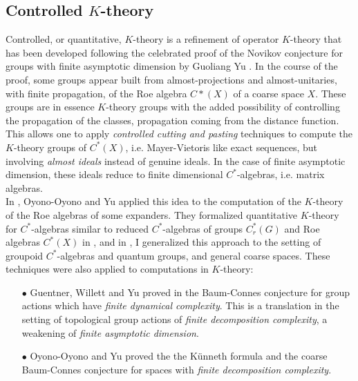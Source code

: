 \subsection{Controlled $K$-theory}

Controlled, or quantitative, $K$-theory is a refinement of operator $K$-theory that has been developed following the celebrated proof of the Novikov conjecture for groups with finite asymptotic dimension by Guoliang Yu \cite{Yu1}. In the course of the proof, some groups appear built from almost-projections and almost-unitaries, with finite propagation, of the Roe algebra $C*(X)$ of a coarse space $X$. These groups are in essence $K$-theory groups with the added possibility of controlling the propagation of the classes, propagation coming from the distance function. This allows one to apply \textit{controlled cutting and pasting} techniques to compute the $K$-theory groups of $C^*(X)$, i.e. Mayer-Vietoris like exact sequences, but involving \textit{almost ideals} instead of genuine ideals. In the case of finite asymptotic dimension, these ideals reduce to finite dimensional $C^*$-algebras, i.e. matrix algebras.\\

In \cite{OY1}, Oyono-Oyono and Yu applied this idea to the computation of the $K$-theory of the Roe algebras of some expanders. They formalized quantitative $K$-theory for $C^*$-algebras similar to reduced $C^*$-algebras of groups $C^*_r(G)$ and Roe algebras $C^*(X)$ in \cite{OY2}, and in \cite{dell2018controlled}, I generalized this approach to the setting of groupoid $C^*$-algebras and quantum groups, and general coarse spaces. These techniques were also applied to computations in $K$-theory:\\
\begin{itemize} 
\item[$\bullet$] Guentner, Willett and Yu proved in \cite{GWY2} the Baum-Connes conjecture for group actions which have \textit{finite dynamical complexity}. This is a translation in the setting of topological group actions of \textit{finite decomposition complexity}, a weakening of \textit{finite asymptotic dimension}.\\   
\item[$\bullet$] Oyono-Oyono and Yu proved the the K\"unneth formula \cite{oyono2019quantitative} and the coarse Baum-Connes conjecture for spaces with \textit{finite decomposition complexity}.\\
\end{itemize}


